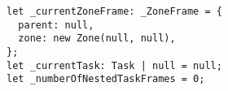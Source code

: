 \begin{verbatim}
let _currentZoneFrame: _ZoneFrame = {
  parent: null,
  zone: new Zone(null, null),
};
let _currentTask: Task | null = null;
let _numberOfNestedTaskFrames = 0;
\end{verbatim}
